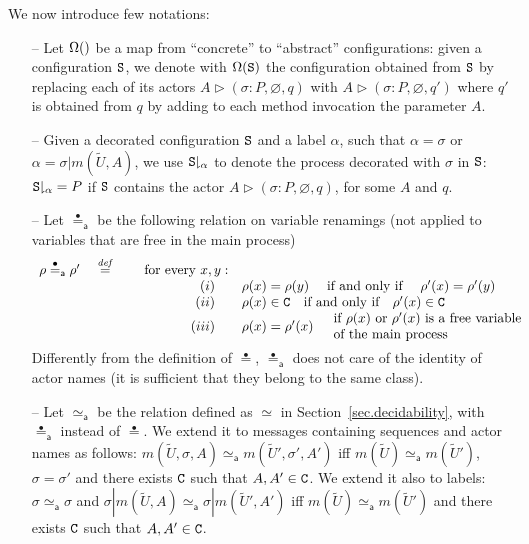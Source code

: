 \documentclass{LMCS}
\theoremstyle{plain}\newtheorem{proposition}[thm]{Proposition}
\theoremstyle{plain}\newtheorem{lemma}[thm]{Lemma}
\theoremstyle{plain}\newtheorem{theorem}[thm]{Theorem}
\theoremstyle{plain}\newtheorem{corollary}[thm]{Corollary}
\newcommand{\State}{{\tt S}}
\newcommand{\eqdef}{\stackrel{{\it def}}{=}}
\newcommand{\proj}[2]{{#1\!\!\downharpoonright_{#2}}}
\newcommand{\wt}[1]{\widetilde{#1}}
\newcommand{\adef}[1]{{\tt #1}}
\newcommand{\eqdot}{\stackrel{\bullet}{=}}
\begin{document}
We now introduce few notations:
\vspace{-1mm}
\begin{itemize}
\item[--]
Let $\Omega()$ be a map
from ``concrete'' to ``abstract'' configurations:
given a configuration $\State$, we denote with
$\abst{\State}$ the configuration
obtained from $\State$
by replacing each of its
actors $A \triangleright (\sigma:P, \varnothing, q)$
with $A \triangleright (\sigma:P, \varnothing, q')$
where $q'$ is obtained from $q$ by adding 
to each method invocation the parameter $A$.
\item[--] Given a decorated configuration $\State$ and a label
$\alpha$, such that $\alpha=\sigma$ or $\alpha=\sigma|m(\wt{U},A)$,
we use $\proj{\State}{\alpha}$ to denote
the process decorated with $\sigma$ in $\State$:
$\proj{\State}{\alpha} = P$ if $\State$ contains the actor
$A \triangleright (\sigma:P, \varnothing, q)$, for some
$A$ and $q$.
\item[--] Let $\eqdot_{\mathsf a}$ be the following relation 
on variable renamings (not applied to variables that are free
in the main process) 
\vspace{-3mm}
\[
\begin{array}{lrl}
\rho \eqdot_{\mathsf a} \rho' \quad \eqdef & \quad \mbox{ for every } x,y: &
\\
& (i) \quad &  
\rho(x) = \rho(y) \quad \mbox{ if and only if } \quad
\mbox{$\rho'(x) = \rho'(y)$}
\\
&(ii) 
\quad & \rho(x) \in \adef{C} \quad \mbox{if and only if} \quad \rho'(x) \in \adef{C}\\
&(iii)
\quad & \rho(x) = \rho'(x) \quad 
\begin{array}{l}
\mbox{if $\rho(x)$ or $\rho'(x)$ is a free variable}\\
\mbox{of the main process}
\end{array}
\vspace{-1mm}
\end{array}
\] 
Differently from
the definition of $\eqdot$, $\eqdot_{\mathsf a}$ does not care of the 
identity of actor names (it is sufficient that
they belong to the same class). \item[--]
Let $\simeq_{\mathsf a}$ be the relation defined as $\simeq$ in Section~\ref{sec.decidability}, with $\eqdot_{\mathsf a}$
instead of $\eqdot$. We extend it
to messages containing sequences and actor names as follows:
$m(\wt{U},\sigma,A) \simeq_{\mathsf a} m(\wt{U}',\sigma',A')$ iff $m(\wt{U}) \simeq_{\mathsf a} m(\wt{U}')$,
$\sigma=\sigma'$ and there exists $\adef{C}$ such that $A,A' \in \adef{C}$.
We extend it also to labels: $\sigma \simeq_{\mathsf a} \sigma$
and $\sigma|m(\wt{U},A) \simeq_{\mathsf a} \sigma|m(\wt{U}',A')$ iff $m(\wt{U}) \simeq_{\mathsf a} m(\wt{U}')$
and there exists $\adef{C}$ such that $A,A' \in \adef{C}$.
\end{itemize}
\end{document}
